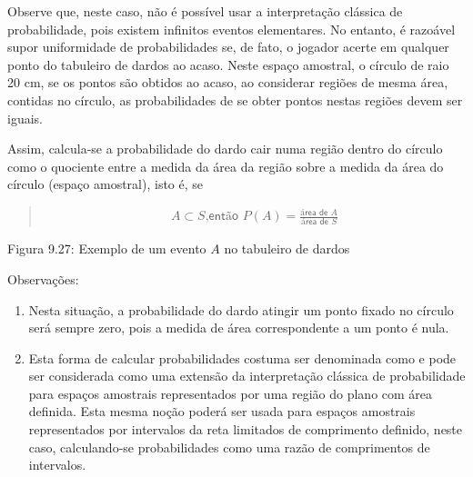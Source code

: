 Observe que, neste caso, não é possível usar a interpretação clássica de probabilidade, pois existem infinitos eventos elementares. No entanto, é razoável supor uniformidade de probabilidades se, de fato, o jogador acerte em qualquer ponto do tabuleiro de dardos ao acaso.  Neste espaço amostral, o círculo de raio 20 cm, se os pontos são obtidos ao acaso, ao considerar regiões de mesma área, contidas no círculo, as probabilidades de se obter pontos nestas regiões devem ser iguais.

Assim, calcula-se a probabilidade do dardo cair numa região dentro do círculo como o quociente entre a medida da área da região sobre a medida da área do círculo (espaço amostral), isto é, se
\begin{quote}
\begin{equation*}
\begin{split}A\subset S \textsf{,então } P(A)=\frac{\textsf{área de }A}{\textsf{área de }S}\end{split}
\end{equation*}\end{quote}
\label{\detokenize{PE511-5:fig-coloque-aqui-o-nome}}
\begin{figure}[H]
\centering

\noindent{}
\label{\detokenize{PE511-5:fig-coloque-aqui-o-nome}}\end{figure}

Figura 9.27: Exemplo de um evento \(A\) no tabuleiro de dardos

Observações:
\begin{enumerate}
\item {} 
Nesta situação, a probabilidade do dardo atingir um ponto fixado no círculo será sempre zero, pois a medida de área correspondente a um ponto é nula.

\item {} 
Esta forma de calcular probabilidades costuma ser denominada como  e pode ser considerada como uma extensão da interpretação clássica de probabilidade para espaços amostrais representados por uma região do plano com área definida. Esta mesma noção poderá ser usada para espaços amostrais representados por intervalos da reta limitados de comprimento definido, neste caso, calculando-se probabilidades como uma razão de comprimentos de intervalos.

\end{enumerate}


